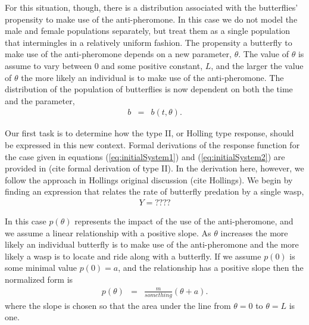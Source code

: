 \documentclass[12pt]{article}
\begin{document}
For this situation, though, there is a distribution associated with
the butterflies' propensity to make use of the anti-pheromone. In this
case we do not model the male and female populations separately, but
treat them as a single population that intermingles in a relatively
uniform fashion. The propensity a butterfly to make use of the
anti-pheromone depends on a new parameter, $\theta$. The value of
$\theta$ is assume to vary between $0$ and some positive constant,
$L$, and the larger the value of $\theta$ the more likely an
individual is to make use of the anti-pheromone. The distribution of
the population of butterflies is now dependent on both the time and
the parameter,
\begin{eqnarray}
  b & = & b(t,\theta).
\end{eqnarray}

Our first task is to determine how the type II, or Holling type
response, should be expressed in this new context. Formal derivations
of the response function for the case given in equations
(\ref{eq:initialSystem1}) and (\ref{eq:initialSystem2}) are provided in
(cite formal derivation of type II). In the derivation here, however,
we follow the approach in Hollings original discussion (cite
Hollings). We begin by finding an expression that relates the rate of
butterfly predation by a single wasp,
\begin{eqnarray}
  \label{eq:processingTime}
  Y = ????
\end{eqnarray}

In this case $p(\theta)$ represents the impact of the use of the
anti-pheromone, and we assume a linear relationship with a positive
slope. As $\theta$ increases the more likely an individual butterfly
is to make use of the anti-pheromone and the more likely a wasp is to
locate and ride along with a butterfly. If we assume $p(0)$ is some
minimal value $p(0)=a$, and the relationship has a positive slope then
the normalized form is
\begin{eqnarray}
  \label{eq:linearFormP}
  p(\theta) & = & \frac{m}{something} \left( \theta + a \right).
\end{eqnarray}
where the slope is chosen so that the area under the line from
$\theta=0$ to $\theta=L$ is one.
\end{document}
